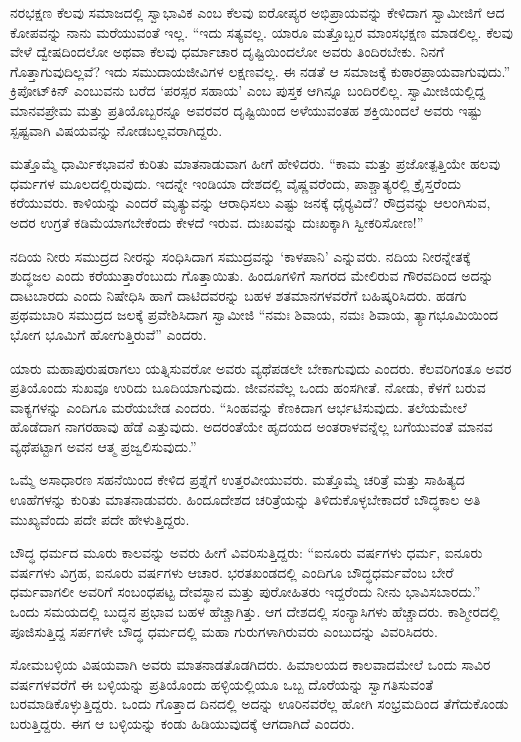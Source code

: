  ನರಭಕ್ಷಣ ಕೆಲವು ಸಮಾಜದಲ್ಲಿ ಸ್ವಾಭಾವಿಕ ಎಂಬ ಕೆಲವು ಐರೋಪ್ಯರ ಅಭಿಪ್ರಾಯವನ್ನು ಕೇಳಿದಾಗ ಸ್ವಾಮೀಜಿಗೆ ಆದ ಕೋಪವನ್ನು ನಾನು ಮರೆಯುವಂತೆ ಇಲ್ಲ. “ಇದು ಸತ್ಯವಲ್ಲ. ಯಾರೂ ಮತ್ತೊಬ್ಬರ ಮಾಂಸಭಕ್ಷಣ ಮಾಡಲಿಲ್ಲ. ಕೆಲವು ವೇಳೆ ದ್ವೇಷದಿಂದಲೋ ಅಥವಾ ಕೆಲವು ಧರ್ಮಾಚಾರ ದೃಷ್ಟಿಯಿಂದಲೋ ಅವರು ತಿಂದಿರಬೇಕು. ನಿನಗೆ ಗೊತ್ತಾಗುವುದಿಲ್ಲವೆ? ಇದು ಸಮುದಾಯಜೀವಿಗಳ ಲಕ್ಷಣವಲ್ಲ. ಈ ನಡತೆ ಆ ಸಮಾಜಕ್ಕೆ ಕುಠಾರಪ್ರಾಯವಾಗುವುದು.” ಕ್ರಿಪೋಟ್‌ಕಿನ್ ಎಂಬುವನು ಬರೆದ ‘ಪರಸ್ಪರ ಸಹಾಯ’ ಎಂಬ ಪುಸ್ತಕ ಆಗಿನ್ನೂ ಬಂದಿರಲಿಲ್ಲ. ಸ್ವಾಮೀಜಿಯಲ್ಲಿದ್ದ ಮಾನವಪ್ರೇಮ ಮತ್ತು ಪ್ರತಿಯೊಬ್ಬರನ್ನೂ ಅವರವರ ದೃಷ್ಟಿಯಿಂದ ಅಳೆಯುವಂತಹ ಶಕ್ತಿಯಿಂದಲೆ ಅವರು ಇಷ್ಟು ಸ್ಪಷ್ಟವಾಗಿ ವಿಷಯವನ್ನು ನೋಡಬಲ್ಲವರಾಗಿದ್ದರು. 

 ಮತ್ತೊಮ್ಮೆ ಧಾರ್ಮಿಕಭಾವನೆ ಕುರಿತು ಮಾತನಾಡುವಾಗ ಹೀಗೆ ಹೇಳಿದರು. “ಕಾಮ ಮತ್ತು ಪ್ರಜೋತ್ಪತ್ತಿಯೇ ಹಲವು ಧರ್ಮಗಳ ಮೂಲದಲ್ಲಿರುವುದು. ಇದನ್ನೇ ಇಂಡಿಯಾ ದೇಶದಲ್ಲಿ ವೈಷ್ಣವರೆಂದು, ಪಾಶ್ಚಾತ್ಯರಲ್ಲಿ ಕ್ರೈಸ್ತರೆಂದು ಕರೆಯುವರು. ಕಾಳಿಯನ್ನು ಎಂದರೆ ಮೃತ್ಯುವನ್ನು ಆರಾಧಿಸಲು ಎಷ್ಟು ಜನಕ್ಕೆ ಧೈರ‍್ಯವಿದೆ? ರೌದ್ರವನ್ನು ಆಲಂಗಿಸುವ, ಅದರ ಉಗ್ರತೆ ಕಡಿಮೆಯಾಗಬೇಕೆಂದು ಕೇಳದೆ ಇರುವ. ದುಃಖವನ್ನು ದುಃಖಕ್ಕಾಗಿ ಸ್ವೀಕರಿಸೋಣ!” 

 ನದಿಯ ನೀರು ಸಮುದ್ರದ ನೀರನ್ನು ಸಂಧಿಸಿದಾಗ ಸಮುದ್ರವನ್ನು ‘ಕಾಳಪಾನಿ’ ಎನ್ನುವರು. ನದಿಯ ನೀರನ್ನೇತಕ್ಕೆ ಶುದ್ಧಜಲ ಎಂದು ಕರೆಯುತ್ತಾರೆಂಬುದು ಗೊತ್ತಾಯಿತು. ಹಿಂದೂಗಳಿಗೆ ಸಾಗರದ ಮೇಲಿರುವ ಗೌರವದಿಂದ ಅದನ್ನು ದಾಟಬಾರದು ಎಂದು ನಿಷೇಧಿಸಿ ಹಾಗೆ ದಾಟಿದವರನ್ನು ಬಹಳ ಶತಮಾನಗಳವರೆಗೆ ಬಹಿಷ್ಕರಿಸಿದರು. ಹಡಗು ಪ್ರಥಮಬಾರಿ ಸಮುದ್ರದ ಜಲಕ್ಕೆ ಪ್ರವೇಶಿಸಿದಾಗ ಸ್ವಾಮೀಜಿ “ನಮಃ ಶಿವಾಯ, ನಮಃ ಶಿವಾಯ, ತ್ಯಾಗಭೂಮಿಯಿಂದ ಭೋಗ ಭೂಮಿಗೆ ಹೋಗುತ್ತಿರುವೆ” ಎಂದರು. 

 ಯಾರು ಮಹಾಪುರುಷರಾಗಲು ಯತ್ನಿಸುವರೋ ಅವರು ವ್ಯಥೆಪಡಲೇ ಬೇಕಾಗುವುದು ಎಂದರು. ಕೆಲವರಿಗಂತೂ ಅವರ ಪ್ರತಿಯೊಂದು ಸುಖವೂ ಉರಿದು ಬೂದಿಯಾಗುವುದು. ಜೀವನವೆಲ್ಲ ಒಂದು ಹಂಸಗೀತೆ. ನೋಡು, ಕೆಳಗೆ ಬರುವ ವಾಕ್ಯಗಳನ್ನು ಎಂದಿಗೂ ಮರೆಯಬೇಡ ಎಂದರು. “ಸಿಂಹವನ್ನು ಕೆಣಕಿದಾಗ ಆರ್ಭಟಿಸುವುದು. ತಲೆಯಮೇಲೆ ಹೊಡೆದಾಗ ನಾಗರಹಾವು ಹೆಡೆ ಎತ್ತುವುದು. ಅದರಂತೆಯೇ ಹೃದಯದ ಅಂತರಾಳವನ್ನೆಲ್ಲ ಬಗೆಯುವಂತೆ ಮಾನವ ವ್ಯಥೆಪಟ್ಟಾಗ ಅವನ ಆತ್ಮ ಪ್ರಜ್ವಲಿಸುವುದು.” 

 ಒಮ್ಮೆ ಅಸಾಧಾರಣ ಸಹನೆಯಿಂದ ಕೇಳಿದ ಪ್ರಶ್ನೆಗೆ ಉತ್ತರವೀಯುವರು. ಮತ್ತೊಮ್ಮೆ ಚರಿತ್ರೆ ಮತ್ತು ಸಾಹಿತ್ಯದ ಊಹೆಗಳನ್ನು ಕುರಿತು ಮಾತನಾಡುವರು. ಹಿಂದೂದೇಶದ ಚರಿತ್ರೆಯನ್ನು ತಿಳಿದುಕೊಳ್ಳಬೇಕಾದರೆ ಬೌದ್ಧಕಾಲ ಅತಿ ಮುಖ್ಯವೆಂದು ಪದೇ ಪದೇ ಹೇಳುತ್ತಿದ್ದರು. 

 ಬೌದ್ಧ ಧರ್ಮದ ಮೂರು ಕಾಲವನ್ನು ಅವರು ಹೀಗೆ ವಿವರಿಸುತ್ತಿದ್ದರು: “ಐನೂರು ವರ್ಷಗಳು ಧರ್ಮ, ಐನೂರು ವರ್ಷಗಳು ವಿಗ್ರಹ, ಐನೂರು ವರ್ಷಗಳು ಆಚಾರ. ಭರತಖಂಡದಲ್ಲಿ ಎಂದಿಗೂ ಬೌದ್ಧಧರ್ಮವೆಂಬ ಬೇರೆ ಧರ್ಮವಾಗಲೀ ಅವರಿಗೆ ಸಂಬಂಧಪಟ್ಟ ದೇವಸ್ಥಾನ ಮತ್ತು ಪುರೋಹಿತರು ಇದ್ದರೆಂದು ನೀನು ಭಾವಿಸಬಾರದು.” ಒಂದು ಸಮಯದಲ್ಲಿ ಬುದ್ಧನ ಪ್ರಭಾವ ಬಹಳ ಹೆಚ್ಚಾಗಿತ್ತು. ಆಗ ದೇಶದಲ್ಲಿ ಸಂನ್ಯಾಸಿಗಳು ಹೆಚ್ಚಾದರು. ಕಾಶ್ಮೀರದಲ್ಲಿ ಪೂಜಿಸುತ್ತಿದ್ದ ಸರ್ಪಗಳೇ ಬೌದ್ಧ ಧರ್ಮದಲ್ಲಿ ಮಹಾ ಗುರುಗಳಾಗಿರುವರು ಎಂಬುದನ್ನು ವಿವರಿಸಿದರು. 

 ಸೋಮಬಳ್ಳಿಯ ವಿಷಯವಾಗಿ ಅವರು ಮಾತನಾಡತೊಡಗಿದರು. ಹಿಮಾಲಯದ ಕಾಲವಾದಮೇಲೆ ಒಂದು ಸಾವಿರ ವರ್ಷಗಳವರೆಗೆ ಈ ಬಳ್ಳಿಯನ್ನು ಪ್ರತಿಯೊಂದು ಹಳ್ಳಿಯಲ್ಲಿಯೂ ಒಬ್ಬ ದೊರೆಯನ್ನು ಸ್ವಾಗತಿಸುವಂತೆ ಬರಮಾಡಿಕೊಳ್ಳುತ್ತಿದ್ದರು. ಒಂದು ಗೊತ್ತಾದ ದಿನದಲ್ಲಿ ಅದನ್ನು ಊರಿನವರೆಲ್ಲ ಹೋಗಿ ಸಂಭ್ರಮದಿಂದ ತೆಗೆದುಕೊಂಡು ಬರುತ್ತಿದ್ದರು. ಈಗ ಆ ಬಳ್ಳಿಯನ್ನು ಕಂಡು ಹಿಡಿಯುವುದಕ್ಕೆ ಆಗದಾಗಿದೆ ಎಂದರು. 

